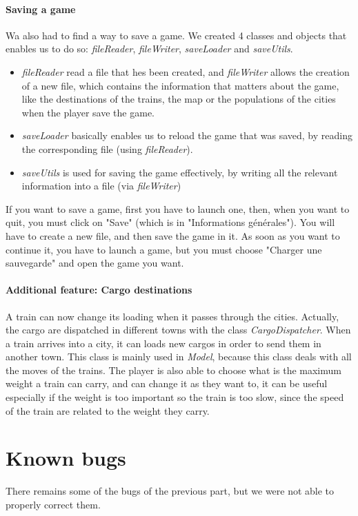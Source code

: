 \documentclass[a4paper]{article}
\begin{document}
	\paragraph{Saving a game} 
	Wa also had to find a way to save a game. We created 4 classes and objects that enables us to do so: \textit{fileReader}, \textit{fileWriter}, \textit{saveLoader} and \textit{saveUtils}.
	\begin{itemize}
		\item \textit{fileReader} read a file that hes been created, and \textit{fileWriter} allows the creation of a new file, which contains the information that matters about the game, like the destinations of the trains, the map or the populations of the cities when the player save the game.
		\item \textit{saveLoader} basically enables us to reload the game that was saved, by reading the corresponding file (using \textit{fileReader}).
		\item  \textit{saveUtils} is used for saving the game effectively, by writing all the relevant information into a file (via \textit{fileWriter})
	\end{itemize}
	If you want to save a game, first you have to launch one, then, when you want to quit, you must click on "Save" (which is in "Informations générales"). You will have to create a new file, and then save the game in it.
	As soon as you want to continue it, you have to launch a game, but you must choose "Charger une sauvegarde" and open the game you want.

	\paragraph{Additional feature: Cargo destinations}
	A train can now change its loading when it passes through the cities. Actually, the cargo are dispatched in different towns with the class \textit{CargoDispatcher}. When a train arrives into a city, it can loads new cargos in order to send them in another town. This class is mainly used in \textit{Model}, because this class deals with all the moves of the trains. The player is also able to choose what is the maximum weight a train can carry, and can change it as they want to, it can be useful especially if the weight is too important so the train is too slow, since the speed of the train are related to the weight they carry.
	
	\section{Known bugs}
	There remains some of the bugs of the previous part, but we were not able to properly correct them.
\end{document}

